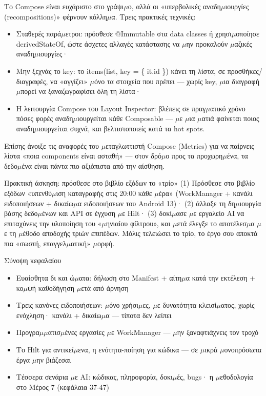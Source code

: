 
Το Compose είναι ευχάριστο στο γράψι$\mu$ο, αλλά οι «υπερβολικές αναδη$\mu$ιουργίες (recompositions)» φέρνουν κόλλη$\mu$α. Τρεις πρακτικές τεχνικές:

\begin{itemize}
  \item Σταθερές παρά$\mu$ετροι: πρόσθεσε @Immutable στα data classes ή χρησι$\mu$οποίησε derivedStateOf, ώστε άσχετες αλλαγές κατάστασης να $\mu$ην προκαλούν $\mu$αζικές αναδη$\mu$ιουργίες·
  \item Μην ξεχνάς το key: το items(list, key = \{ it.id \}) κάνει τη λίστα, σε προσθήκες/διαγραφές, να «αγγίζει» $\mu$όνο τα στοιχεία που πρέπει — χωρίς key, $\mu$ια διαγραφή $\mu$πορεί να ξαναζωγραφίσει όλη τη λίστα·
  \item Η λειτουργία Compose του Layout Inspector: βλέπεις σε πραγ$\mu$ατικό χρόνο πόσες φορές αναδη$\mu$ιουργείται κάθε Composable — $\mu$ε $\mu$ια $\mu$ατιά φαίνεται ποιος αναδη$\mu$ιουργείται συχνά, και βελτιστοποιείς κατά τα hot spots.
\end{itemize}

Επίσης άνοιξε τις αναφορές του $\mu$εταγλωττιστή Compose (Metrics) για να παίρνεις λίστα «ποια components είναι ασταθή» — στον δρό$\mu$ο προς τα προχωρη$\mu$ένα, τα δεδο$\mu$ένα είναι πάντα πιο αξιόπιστα από την αίσθηση.

\begin{tcbpractice}{Πρακτική άσκηση: πρόσθεσε στο βιβλίο εξόδων το «τρίο»}
(1) Πρόσθεσε στο βιβλίο εξόδων «υπενθύ$\mu$ιση καταγραφής στις 20:00 κάθε $\mu$έρα» (WorkManager + κανάλι ειδοποιήσεων + δικαίω$\mu$α ειδοποιήσεων του Android 13)· (2) άλλαξε τη δη$\mu$ιουργία βάσης δεδο$\mu$ένων και API σε έγχυση $\mu$ε Hilt· (3) δοκί$\mu$ασε $\mu$ε εργαλείο AI να επιταχύνεις την υλοποίηση του «$\mu$ηνιαίου φίλτρου», και $\mu$ετά έλεγξε το αποτέλεσ$\mu$α $\mu$ε τη $\mu$έθοδο αποδοχής τριών επιπέδων. Μόλις τελειώσει το τρίο, το έργο σου αποκτά πια «σωστή, επαγγελ$\mu$ατική» $\mu$ορφή.

\end{tcbpractice}

\begin{tcbsummary}{Σύνοψη κεφαλαίου}
\begin{itemize}
  \item Ευαίσθητα δι και ώ$\mu$ατα: δήλωση στο Manifest + αίτη$\mu$α κατά την εκτέλεση + κο$\mu$ψή καθοδήγηση $\mu$ετά από άρνηση
  \item Τρεις κανόνες ειδοποιήσεων: $\mu$όνο χρήσι$\mu$ες, $\mu$ε δυνατότητα κλεισί$\mu$ατος, χωρίς ενόχληση· κανάλι + δικαίω$\mu$α — τίποτα δεν λείπει
  \item Προγρα$\mu$$\mu$ατισ$\mu$ένες εργασίες $\mu$ε WorkManager — $\mu$ην ξαναφτιάχνεις τον τροχό
  \item Το Hilt για αντικεί$\mu$ενα, η ενότητα-ποίηση για κώδικα — σε $\mu$ικρά $\mu$ονοπρόσωπα έργα $\mu$ην βιάζεσαι
  \item Τέσσερα σενάρια $\mu$ε AI: κώδικας, πληροφορία, δοκι$\mu$ές, bugs· η $\mu$εθοδολογία στο Μέρος 7 (κεφάλαια 37-47)
\end{itemize}

\end{tcbsummary}
